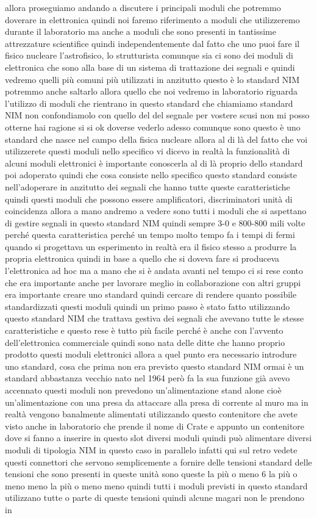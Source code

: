 allora proseguiamo andando a discutere i principali moduli che potremmo doverare in elettronica quindi noi faremo riferimento a moduli che utilizzeremo durante il laboratorio ma anche a moduli che sono presenti in tantissime attrezzature scientifice quindi independentemente dal fatto che uno puoi fare il fisico nucleare l'astrofisico, lo strutturista comunque sia ci sono dei moduli di elettronica che sono alla base di un sistema di trattazione dei segnali e quindi vedremo quelli più comuni più utilizzati in anzitutto questo è lo standard NIM potremmo anche saltarlo allora quello che noi vedremo in laboratorio riguarda l'utilizzo di moduli che rientrano in questo standard che chiamiamo standard NIM non confondiamolo con quello del del segnale per vostere scusi non mi posso otterne hai ragione si si ok doverse vederlo adesso comunque sono questo è uno standard che nasce nel campo della fisica nucleare allora al di là del fatto che voi utilizzerete questi moduli nello specifico vi dicevo in realtà la funzionalità di alcuni moduli elettronici è importante conoscerla al di là proprio dello standard poi adoperato quindi che cosa consiste nello specifico questo standard consiste nell'adoperare in anzitutto dei segnali che hanno tutte queste caratteristiche quindi questi moduli che possono essere amplificatori, discriminatori unità di coincidenza allora a mano andremo a vedere sono tutti i moduli che si aspettano di gestire segnali in questo standard NIM quindi sempre 3-0 e 800-800 mili volte perché questa caratteristica perché un tempo molto tempo fa i tempi di fermi quando si progettava un esperimento in realtà era il fisico stesso a produrre la propria elettronica quindi in base a quello che si doveva fare si produceva l'elettronica ad hoc ma a mano che si è andata avanti nel tempo ci si rese conto che era importante anche per lavorare meglio in collaborazione con altri gruppi era importante creare uno standard quindi cercare di rendere quanto possibile standardizzati questi moduli quindi un primo passo è stato fatto utilizzando questo standard NIM che trattava gestiva dei segnali che avevano tutte le stesse caratteristiche e questo rese è tutto più facile perché è anche con l'avvento dell'elettronica commerciale quindi sono nata delle ditte che hanno proprio prodotto questi moduli elettronici allora a quel punto era necessario introdure uno standard, cosa che prima non era previsto questo standard NIM ormai è un standard abbastanza vecchio nato nel 1964 però fa la sua funzione già avevo accennato questi moduli non prevedono un'alimentazione stand alone cioè un'alimentazione con una presa da attaccare alla presa di corrente al muro ma in realtà vengono banalmente alimentati utilizzando questo contenitore che avete visto anche in laboratorio che prende il nome di Crate e appunto un contenitore dove si fanno a inserire in questo slot diversi moduli quindi può alimentare diversi moduli di tipologia NIM in questo caso in parallelo infatti qui sul retro vedete questi connettori che servono semplicemente a fornire delle tensioni standard delle tensioni che sono presenti in queste unità sono queste la più o meno 6 la più o meno meno la più o meno meno quindi tutti i moduli previsti in questo standard utilizzano tutte o parte di queste tensioni quindi alcune magari non le prendono in 